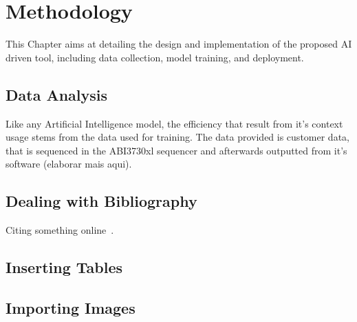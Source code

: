 
%

\makeatletter
\newcommand{\ntifpkgloaded}{%
  \@ifpackageloaded%
}
\makeatother


\chapter{Methodology}
\label{cha:Methodology}

This Chapter aims at detailing the design and implementation of the proposed AI driven
tool, including data collection, model training, and deployment.

\section{Data Analysis} %
\label{sec:data_analysis}

Like any Artificial Intelligence model, the efficiency that result from it's context usage stems from the data used for training. 
The data provided is customer data, that is sequenced in the ABI3730xl sequencer and afterwards outputted from it's software (elaborar mais aqui).




\section{Dealing with Bibliography} %
\label{sec:dealing_with_bibliography}

Citing something online~\cite{wiki:shuntingyard,flex,bison}.



\section{Inserting Tables} %
\label{sec:inserting_tables}



\section{Importing Images} %
\label{sec:importing_images}

